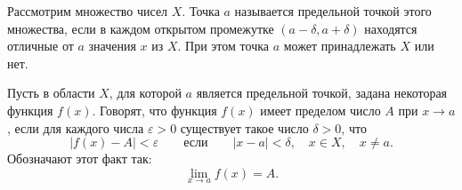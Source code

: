 \begin{rusblock}
Рассмотрим множество чисел $X$. Точка $a$ называется предельной точкой этого множества, если в каждом открытом промежутке $(a-\delta,a+\delta)$ находятся отличные от $a$ значения $x$ из $X$. При этом точка $a$ может принадлежать $X$ или нет.

Пусть в области $X$, для которой $a$ является предельной точкой, задана некоторая функция $f(x)$. Говорят, что функция $f(x)$ имеет пределом число $A$ при $x\to a$, если для каждого числа $\varepsilon>0$ существует такое число $\delta>0$, что
\[
|f(x)-A|<\varepsilon\qquad\text{если}\qquad |x-a|<\delta,\quad x\in X,\quad x\ne a.
\]
Обозначают этот факт так:
\[
\lim_{x\to a}f(x)=A.
\]
\end{rusblock}

